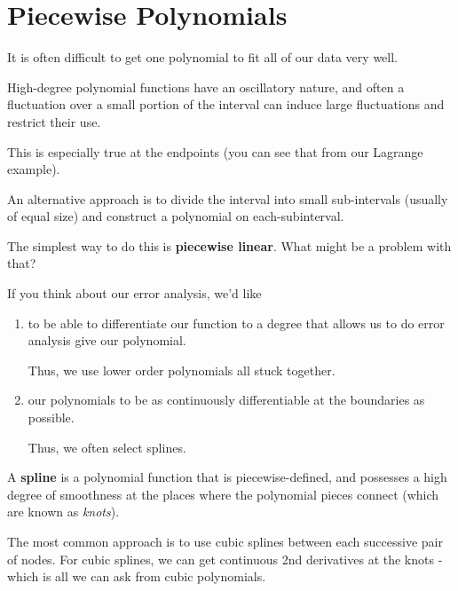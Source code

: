 \documentclass[12pt]{article}
\begin{document}
\section{Piecewise Polynomials}

It is often difficult to get one polynomial to fit all of our data very well. 

High-degree polynomial functions have an oscillatory nature, and often a fluctuation over a small portion of the interval can induce large fluctuations and restrict their use.

This is especially true at the endpoints (you can see that from our Lagrange example).

An alternative approach is to divide the interval into small sub-intervals (usually of equal size) and construct a polynomial on each-subinterval.

The simplest way to do this is \textbf{piecewise linear}. What might be a problem with that?

If you think about our error analysis, we'd like 
\begin{enumerate}
\item to be able to differentiate our function to a degree that allows us to do error analysis give our polynomial.

Thus, we use lower order polynomials all stuck together.

\item our polynomials to be as continuously differentiable at the boundaries as possible.

Thus, we often select splines. 
\end{enumerate}
%
A \textbf{spline} is a polynomial function that is piecewise-defined, and possesses a high degree of smoothness at the places where the polynomial pieces connect (which are known as \textit{knots}).

The most common approach is to use cubic splines between each successive pair of nodes. For cubic splines, we can get continuous 2nd derivatives at the knots - which is all we can ask from cubic polynomials. 



%
% 
\end{document}
